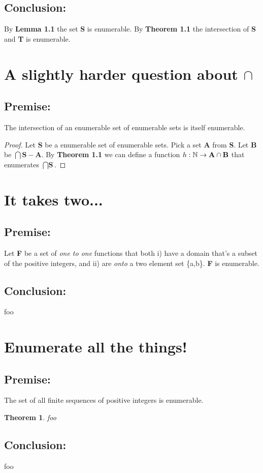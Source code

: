 \documentclass[a4paper,11pt]{article}
\newtheorem{thm}{Theorem}[section]
\begin{document}
	\subsection*{Conclusion:}
	By \textbf{Lemma 1.1} the set \textbf{S} is enumerable.  By \textbf{Theorem 1.1} the intersection
	of \textbf{S} and \textbf{T} is enumerable.
		
\pagebreak


\section{A slightly harder question about $\cap$}

	\subsection*{Premise:}
	The intersection of an enumerable set of enumerable sets is itself enumerable.

	\bigskip
	
	\begin{proof}
	Let \textbf{S} be a enumerable set of enumerable sets. Pick a set \textbf{A} from \textbf{S}. Let
	\textbf{B} be $\bigcap \textbf{S} - \textbf{A}$. By \textbf{Theorem 1.1} we can define a function 
	$\mathnormal{h}: \mathbb{N} \rightarrow \textbf{A} \cap \textbf{B}$ that enumerates $\bigcap \textbf{S}$.	
	\end{proof}


\section{It takes two...}

	\subsection*{Premise:}
	Let \textbf{F} be a set of \textit{one to one} functions that both i) have a domain that's a subset of the positive
	integers, and ii) are \textit{onto} a two element set \{a,b\}. \textbf{F} is enumerable.

	\subsection*{Conclusion:}
	foo


\section{Enumerate all the things!}

	\subsection*{Premise:}
	The set of all finite sequences of positive integers is enumerable.
	
	\bigskip
	
	\begin{thm}foo\end{thm}
	

	\subsection*{Conclusion:}
	foo
\end{document}
